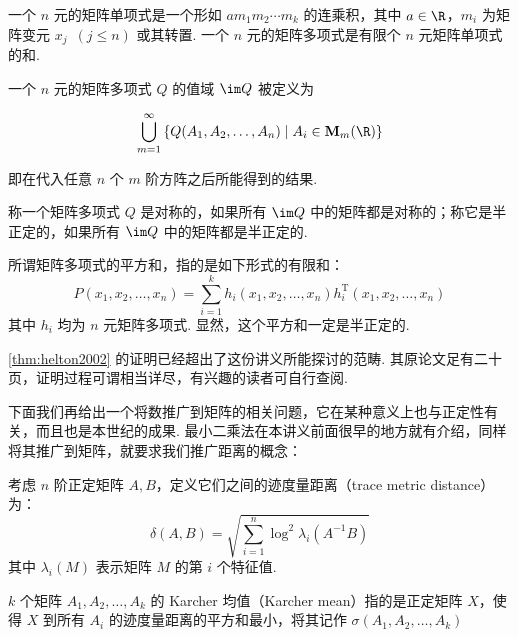 \begin{definition}{}{}
    一个 $n$ 元的矩阵单项式是一个形如 $am_1m_2 \cdots m_k$ 的连乘积，其中 $a \in \R$，$m_i$ 为矩阵变元 $x_j \enspace(j \leqslant n)$ 或其转置. 一个 $n$ 元的矩阵多项式是有限个 $n$ 元矩阵单项式的和.
\end{definition}

\begin{definition}{}{}
    一个 $n$ 元的矩阵多项式 $Q$ 的值域 $\im Q$ 被定义为

    \[ \bigcup_{m = 1}^\infty\left\{Q(A_1, A_2, \ldots, A_n) \mid A_i \in \mathbf{M}_m(\R)\right\} \]

    即在代入任意 $n$ 个 $m$ 阶方阵之后所能得到的结果.
\end{definition}

\begin{definition}{}{}
    称一个矩阵多项式 $Q$ 是对称的，如果所有 $\im Q$ 中的矩阵都是对称的；称它是半正定的，如果所有 $\im Q$ 中的矩阵都是半正定的.
\end{definition}

\begin{definition}{}{}
    所谓矩阵多项式的平方和，指的是如下形式的有限和：
    \[ P(x_1, x_2, \ldots, x_n) = \sum_{i = 1}^k h_i(x_1, x_2, \ldots, x_n)h_i^\mathrm{T}(x_1, x_2, \ldots, x_n) \]
    其中 $h_i$ 均为 $n$ 元矩阵多项式. 显然，这个平方和一定是半正定的.
\end{definition}

\autoref{thm:helton2002} 的证明已经超出了这份讲义所能探讨的范畴. 其原论文足有二十页，证明过程可谓相当详尽，有兴趣的读者可自行查阅.

下面我们再给出一个将数推广到矩阵的相关问题，它在某种意义上也与正定性有关，而且也是本世纪的成果. 最小二乘法在本讲义前面很早的地方就有介绍，同样将其推广到矩阵，就要求我们推广距离的概念：

\begin{definition}{}{}
    考虑 $n$ 阶正定矩阵 $A, B$，定义它们之间的迹度量距离（trace metric distance）为：
    \[ \delta(A, B) = \sqrt{\sum_{i = 1}^n \log^2\lambda_i(A^{-1}B)} \]
    其中 $\lambda_i(M)$ 表示矩阵 $M$ 的第 $i$ 个特征值.
\end{definition}

\begin{definition}{}{}
    $k$ 个矩阵 $A_1, A_2, \ldots, A_k$ 的 Karcher 均值（Karcher mean）指的是正定矩阵 $X$，使得 $X$ 到所有 $A_i$ 的迹度量距离的平方和最小，将其记作 $\sigma(A_1, A_2, \ldots, A_k)$
\end{definition}

